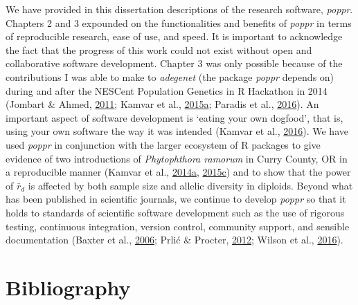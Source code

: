 \documentclass[double,11pt]{beavtex}
\begin{document}
  We have provided in this dissertation descriptions of the research
  software, \emph{poppr}. Chapters 2 and 3 expounded on the
  functionalities and benefits of \emph{poppr} in terms of reproducible
  research, ease of use, and speed. It is important to acknowledge the
  fact that the progress of this work could not exist without open and
  collaborative software development. Chapter 3 was only possible because
  of the contributions I was able to make to \emph{adegenet} (the package
  \emph{poppr} depends on) during and after the NESCent Population
  Genetics in R Hackathon in 2014 (Jombart \& Ahmed,
  \protect\hyperlink{ref-jombart2011adegenet}{2011}; Kamvar et al.,
  \protect\hyperlink{ref-kamvar2015novel}{2015}\protect\hyperlink{ref-kamvar2015novel}{a};
  Paradis et al., \protect\hyperlink{ref-paradis2016towards}{2016}). An
  important aspect of software development is `eating your own dogfood',
  that is, using your own software the way it was intended (Kamvar et al.,
  \protect\hyperlink{ref-kamvar2016developing}{2016}). We have used
  \emph{poppr} in conjunction with the larger ecosystem of R packages to
  give evidence of two introductions of \emph{Phytophthora ramorum} in
  Curry County, OR in a reproducible manner (Kamvar et al.,
  \protect\hyperlink{ref-kamvar2014sudden}{2014}\protect\hyperlink{ref-kamvar2014sudden}{a},
  \protect\hyperlink{ref-kamvar2015spatial}{2015}\protect\hyperlink{ref-kamvar2015spatial}{c})
  and to show that the power of \(\bar{r}_d\) is affected by both sample
  size and allelic diversity in diploids. Beyond what has been published
  in scientific journals, we continue to develop \emph{poppr} so that it
  holds to standards of scientific software development such as the use of
  rigorous testing, continuous integration, version control, community
  support, and sensible documentation (Baxter et al.,
  \protect\hyperlink{ref-baxter2006scientific}{2006}; Prlić \& Procter,
  \protect\hyperlink{ref-prliac2012software}{2012}; Wilson et al.,
  \protect\hyperlink{ref-wilson2016good}{2016}).
  
  \backmatter
  
  \chapter{Bibliography}\label{bibliography}
  
  \noindent
  
  \setlength{\parindent}{-0.20in} \setlength{\leftskip}{0.20in}
  \setlength{\parskip}{8pt} \singlespacing
  
\end{document}
